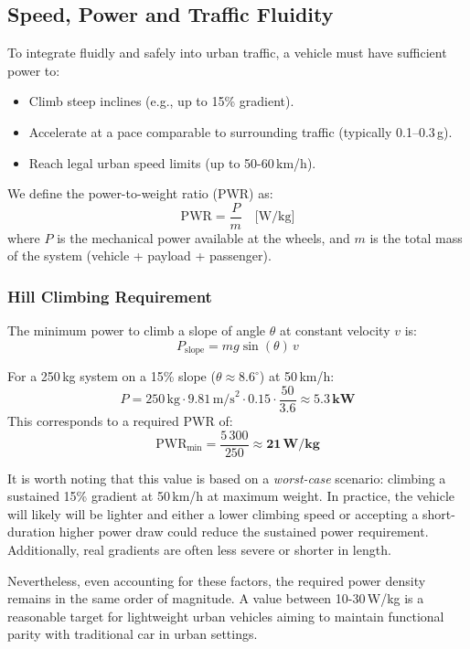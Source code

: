 \subsection{Speed, Power and Traffic Fluidity}

To integrate fluidly and safely into urban traffic, a vehicle must have sufficient power to:
\begin{itemize}
    \item Climb steep inclines (e.g., up to 15\% gradient).
    \item Accelerate at a pace comparable to surrounding traffic (typically 0.1--0.3\,g).
    \item Reach legal urban speed limits (up to 50-60\,km/h).
\end{itemize}

\noindent
We define the power-to-weight ratio (PWR) as:
\[
    \text{PWR} = \frac{P}{m} \quad \text{[W/kg]}
\]
where $P$ is the mechanical power available at the wheels, and $m$ is the total mass of the system (vehicle + payload + passenger).

\subsubsection*{Hill Climbing Requirement}

The minimum power to climb a slope of angle $\theta$ at constant velocity $v$ is:
\[
    P_{\text{slope}} = m g \sin(\theta)\,v
\]

\noindent
For a 250\,kg system on a 15\% slope ($\theta \approx 8.6^\circ$) at 50\,km/h:
\[
    P = 250\,\text{kg} \cdot 9.81\,\text{m/s}^2 \cdot 0.15 \cdot \frac{50}{3.6} \approx \mathbf{5.3\,kW}
\]
This corresponds to a required PWR of:
\[
    \text{PWR}_{\text{min}} = \frac{5\,300}{250} \approx \mathbf{21\,W/kg}
\]

It is worth noting that this value is based on a \emph{worst-case} scenario: climbing a sustained 15\% gradient at 50\,km/h at maximum weight. In practice, the vehicle will likely will be lighter and either a lower climbing speed or accepting a short-duration higher power draw could reduce the sustained power requirement. Additionally, real gradients are often less severe or shorter in length.

Nevertheless, even accounting for these factors, the required power density remains in the same order of magnitude. A value between 10-30\,W/kg is a reasonable target for lightweight urban vehicles aiming to maintain functional parity with traditional car in urban settings.

